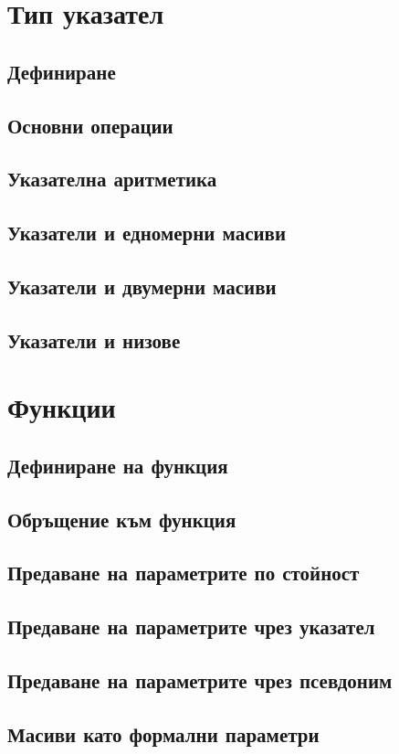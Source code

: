 \documentclass[fleqn,12pt]{article}
\begin{document}
\begin{flushleft}
\section{Тип указател}
\subsection{Дефиниране}
\subsection{Основни операции}
\subsection{Указателна аритметика}
\subsection{Указатели и едномерни масиви}
\subsection{Указатели и двумерни масиви}
\subsection{Указатели и низове}

\section{Функции}
\subsection{Дефиниране на функция}
\subsection{Обръщение към функция}
\subsection{Предаване на параметрите по стойност}
\subsection{Предаване на параметрите чрез указател}
\subsection{Предаване на параметрите чрез псевдоним}
\subsection{Масиви като формални параметри}

\end{flushleft}
\end{document}
